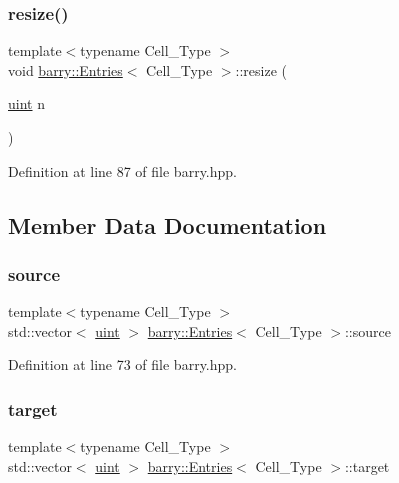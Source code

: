 \subsubsection{\texorpdfstring{resize()}{resize()}}
{\footnotesize\ttfamily template$<$typename Cell\+\_\+\+Type $>$ \\
void \hyperlink{classbarry_1_1_entries}{barry\+::\+Entries}$<$ Cell\+\_\+\+Type $>$\+::resize (\begin{DoxyParamCaption}\item[{\hyperlink{namespacebarry_a11dfc53ddb4672278319aa04f1e09a6c}{uint}}]{n }\end{DoxyParamCaption})\hspace{0.3cm}{\ttfamily [inline]}}



Definition at line 87 of file barry.\+hpp.



\subsection{Member Data Documentation}
\mbox{\label{classbarry_1_1_entries_a5992282ca5f39dbbbd4195d7176b6295}} 
\subsubsection{\texorpdfstring{source}{source}}
{\footnotesize\ttfamily template$<$typename Cell\+\_\+\+Type $>$ \\
std\+::vector$<$ \hyperlink{namespacebarry_a11dfc53ddb4672278319aa04f1e09a6c}{uint} $>$ \hyperlink{classbarry_1_1_entries}{barry\+::\+Entries}$<$ Cell\+\_\+\+Type $>$\+::source}



Definition at line 73 of file barry.\+hpp.

\mbox{\label{classbarry_1_1_entries_a07de39535af23bc1f9e3918b32a39b18}} 
\subsubsection{\texorpdfstring{target}{target}}
{\footnotesize\ttfamily template$<$typename Cell\+\_\+\+Type $>$ \\
std\+::vector$<$ \hyperlink{namespacebarry_a11dfc53ddb4672278319aa04f1e09a6c}{uint} $>$ \hyperlink{classbarry_1_1_entries}{barry\+::\+Entries}$<$ Cell\+\_\+\+Type $>$\+::target}



